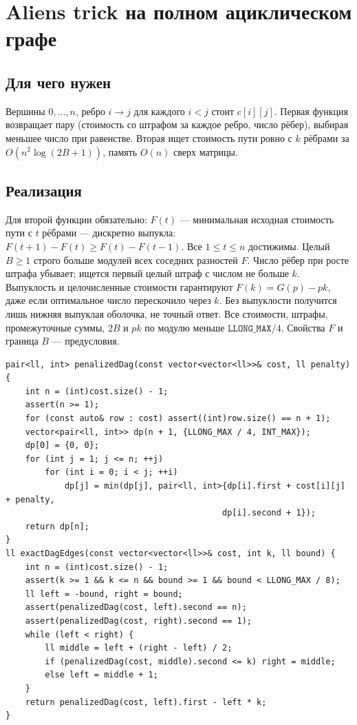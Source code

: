 \iffalse
\section{Aliens trick на полном ациклическом графе}
\subsection*{Для чего нужен}
Вершины $0,\ldots,n$, ребро $i\to j$ для каждого $i<j$ стоит $c[i][j]$.
Первая функция возвращает пару (стоимость со штрафом за каждое ребро,
число рёбер), выбирая меньшее число при равенстве. Вторая ищет стоимость
пути ровно с $k$ рёбрами за $O(n^2\log(2B+1))$, память $O(n)$ сверх матрицы.
\subsection*{Реализация}
Для второй функции обязательно: $F(t)$ --- минимальная исходная стоимость
пути с $t$ рёбрами --- дискретно выпукла:
$F(t+1)-F(t)\ge F(t)-F(t-1)$. Все $1\le t\le n$ достижимы.
Целый $B\ge1$ строго больше модулей всех соседних разностей $F$.
Число рёбер при росте штрафа убывает; ищется первый целый штраф с числом
не больше $k$. Выпуклость и целочисленные стоимости гарантируют
$F(k)=G(p)-pk$, даже если оптимальное число перескочило через $k$.
Без выпуклости получится лишь нижняя выпуклая оболочка, не точный ответ.
Все стоимости, штрафы, промежуточные суммы, $2B$ и $pk$ по модулю меньше
$\texttt{LLONG\_MAX}/4$. Свойства $F$ и граница $B$ --- предусловия.
\begin{lstlisting}[name=optimization_aliens]
pair<ll, int> penalizedDag(const vector<vector<ll>>& cost, ll penalty) {
    int n = (int)cost.size() - 1;
    assert(n >= 1);
    for (const auto& row : cost) assert((int)row.size() == n + 1);
    vector<pair<ll, int>> dp(n + 1, {LLONG_MAX / 4, INT_MAX});
    dp[0] = {0, 0};
    for (int j = 1; j <= n; ++j)
        for (int i = 0; i < j; ++i)
            dp[j] = min(dp[j], pair<ll, int>{dp[i].first + cost[i][j] + penalty,
                                            dp[i].second + 1});
    return dp[n];
}
ll exactDagEdges(const vector<vector<ll>>& cost, int k, ll bound) {
    int n = (int)cost.size() - 1;
    assert(k >= 1 && k <= n && bound >= 1 && bound < LLONG_MAX / 8);
    ll left = -bound, right = bound;
    assert(penalizedDag(cost, left).second == n);
    assert(penalizedDag(cost, right).second == 1);
    while (left < right) {
        ll middle = left + (right - left) / 2;
        if (penalizedDag(cost, middle).second <= k) right = middle;
        else left = middle + 1;
    }
    return penalizedDag(cost, left).first - left * k;
}
\end{lstlisting}
